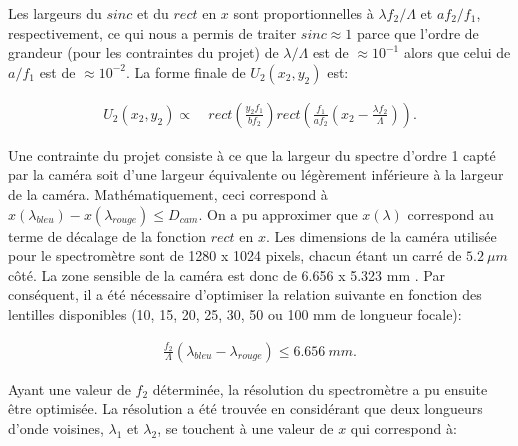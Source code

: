 \documentclass[conference]{IEEEtran}
\begin{document}
Les largeurs du $sinc$ et du $rect$ en $x$ sont proportionnelles à $\lambda f_2/\Lambda$ et $af_2/f_1$, respectivement, ce qui nous
a permis de traiter $sinc\approx1$ parce que l'ordre de grandeur (pour les contraintes du projet) de $\lambda/\Lambda$ est de $\approx10^{-1}$ alors que celui de $a/f_1$ est
de $\approx10^{-2}$. La forme finale de $U_2(x_2,y_2)$ est:

\begin{align*}
    U_2(x_2,y_2)\propto&\ rect(\frac{y_2 f_1}{b f_2})rect(\frac{f_1}{a f_2}(x_2-\frac{\lambda f_2}{\Lambda})).
\end{align*}

Une contrainte du projet consiste à ce que la largeur du spectre d'ordre 1 capté par la caméra
soit d'une largeur équivalente ou légèrement inférieure à la largeur de la caméra. Mathématiquement, ceci correspond à
$x(\lambda_{bleu})-x(\lambda_{rouge})\leq D_{cam}$. On a pu approximer que $x(\lambda)$ correspond au terme de décalage
de la fonction $rect$ en $x$. Les dimensions de la caméra utilisée pour le spectromètre sont de 1280 x 1024 pixels, chacun étant un carré de
$5.2\ \mu m$ côté. La zone sensible de la caméra est donc de 6.656 x 5.323 mm \cite{camera}. Par conséquent, il a été nécessaire d'optimiser la relation suivante
en fonction des lentilles disponibles (10, 15, 20, 25, 30, 50 ou 100 mm de longueur focale):

\begin{align*}
    \frac{f_2}{\Lambda}(\lambda_{bleu}-\lambda_{rouge})\leq 6.656\ mm.
\end{align*}

Ayant une valeur de $f_2$ déterminée, la résolution du spectromètre a pu ensuite être optimisée. La résolution a été trouvée en
considérant que deux longueurs d'onde voisines, $\lambda_1$ et $\lambda_2$, se touchent à une valeur de $x$ qui correspond à:
\end{document}
